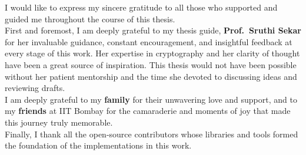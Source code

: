 \acknowledgments
I would like to express my sincere gratitude to all those who supported and guided me throughout the course of this thesis.
\\First and foremost, I am deeply grateful to my thesis guide, \textbf{Prof.\ Sruthi Sekar} for her invaluable guidance, constant encouragement, and insightful feedback at every stage of this work. Her expertise in cryptography and her clarity of thought have been a great source of inspiration. This thesis would not have been possible without her patient mentorship and the time she devoted to discussing ideas and reviewing drafts.
\\I am deeply grateful to my \textbf{family} for their unwavering love and support, and to my \textbf{friends} at IIT Bombay for the camaraderie and moments of joy that made this journey truly memorable.
\\Finally, I thank all the open-source contributors whose libraries and tools formed the foundation of the implementations in this work.




